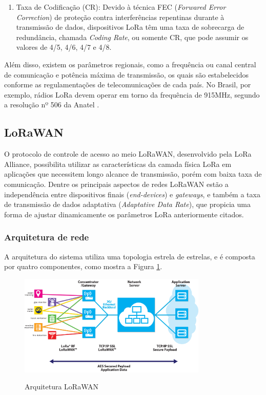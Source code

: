 \documentclass[oneside,openright,12pt]{ufsm_2015} %
\begin{document}
\begin{enumerate}
\begin{figure}[ht]
    \end{figure}
    
    \item Taxa de Codificação (CR): Devido à técnica FEC (\textit{Forwared Error Correction}) de proteção contra interferências repentinas durante à transmissão de dados, dispositivos LoRa têm uma taxa de sobrecarga de redundância, chamada \textit{Coding Rate}, ou somente CR, que pode assumir os valores de 4/5, 4/6, 4/7 e 4/8.
\end{enumerate}

Além disso, existem os parâmetros regionais, como a frequência ou canal central de comunicação e potência máxima de transmissão, os quais são estabelecidos conforme as regulamentações de telecomunicações de cada país. No Brasil, por exemplo, rádios LoRa devem operar em torno da frequência de 915MHz, segundo a resolução nº 506 da Anatel \cite{ttn-frequencies}.

\subsection{LoRaWAN}
O protocolo de controle de acesso ao meio LoRaWAN, desenvolvido pela LoRa Alliance, possibilita utilizar as características da camada física LoRa em aplicações que necessitem longo alcance de transmissão, porém com baixa taxa de comunicação. Dentre os principais aspectos de redes LoRaWAN estão a independência entre dispositivos finais (\textit{end-devices}) e \textit{gateways}, e também a taxa de transmissão de dados adaptativa (\textit{Adaptative Data Rate}), que propicia uma forma de ajustar dinamicamente os parâmetros LoRa anteriormente citados.


\subsubsection{Arquitetura de rede}
\par
A arquitetura do sistema utiliza uma topologia estrela de estrelas, e é composta por quatro componentes, como mostra a Figura \ref{fig:lora-arch}.
\begin{figure}[H]
    \caption{\label{exepretex} Arquitetura LoRaWAN}
    \centering
    \includegraphics[width=0.8\textwidth]{figuras/what-network_diagram.png}
    \vspace{\baselineskip} %
        \label{fig:lora-arch}
\end{figure}
\end{document}
